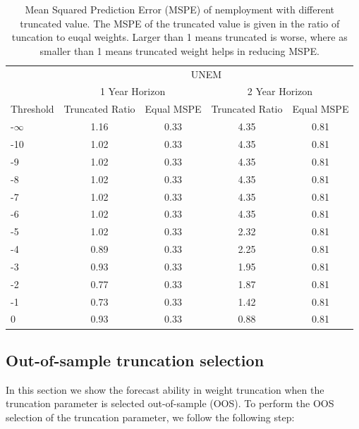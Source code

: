 \documentclass[]{article}
\begin{document}
\begin{table}[!h]
\centering
\caption{Mean Squared Prediction Error (MSPE) of nemployment with different truncated value. The MSPE of the truncated value is given in the ratio of tuncation to euqal weights. Larger than 1 means truncated is worse, where as smaller than 1 means truncated weight helps in reducing MSPE.}
\label{tab: MSPE UNEM}
\begin{tabular}{lcccc}
\hline
          & \multicolumn{4}{c}{UNEM}                                                \\
          \cmidrule{2-5}
          & \multicolumn{2}{c}{1 Year Horizon} & \multicolumn{2}{c}{2 Year Horizon} \\
          \cmidrule{2-3} \cmidrule{4-5}
Threshold & Truncated Ratio    & Equal MSPE    & Truncated Ratio    & Equal MSPE    \\
\cmidrule{1-1} \cmidrule{2-2} \cmidrule{3-3} \cmidrule{4-4} \cmidrule{5-5}
-$\infty$ & 1.16 & 0.33 & 4.35 & 0.81 \\
-10       & 1.02 & 0.33 & 4.35 & 0.81 \\
-9        & 1.02 & 0.33 & 4.35 & 0.81 \\
-8        & 1.02 & 0.33 & 4.35 & 0.81 \\
-7        & 1.02 & 0.33 & 4.35 & 0.81 \\
-6        & 1.02 & 0.33 & 4.35 & 0.81 \\
-5        & 1.02 & 0.33 & 2.32 & 0.81 \\
-4        & 0.89 & 0.33 & 2.25 & 0.81 \\
-3        & 0.93 & 0.33 & 1.95 & 0.81 \\
-2        & 0.77 & 0.33 & 1.87 & 0.81 \\
-1        & 0.73 & 0.33 & 1.42 & 0.81 \\
0         & 0.93 & 0.33 & 0.88 & 0.81 \\ \hline
\end{tabular}
\end{table}

\subsection{Out-of-sample truncation
selection}\label{out-of-sample-truncation-selection}

In this section we show the forecast ability in weight truncation when
the truncation parameter is selected out-of-sample (OOS). To perform the
OOS selection of the truncation parameter, we follow the following step:
\end{document}
